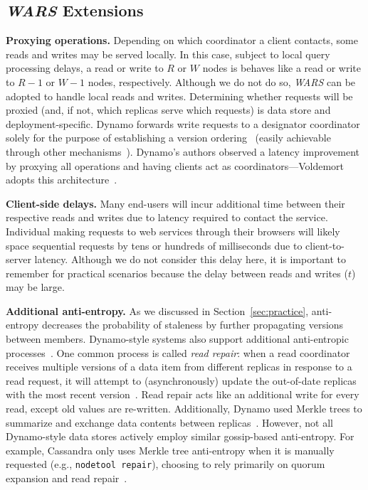 \documentclass{vldb}
\newcommand{\subsectionskip}{-0em}
\begin{document}
\vspace{\subsectionskip}\subsection{{\large \textit{WARS}} Extensions}
\label{sec:anti-entropy}

\textbf{Proxying operations.} Depending on which coordinator a client contacts, some reads and
writes may be served locally.  In this case, subject to local query
processing delays, a read or write to $R$ or $W$ nodes is behaves like
a read or write to $R-1$ or $W-1$ nodes, respectively.  Although we do
not do so, \textit{WARS} can be adopted to handle local reads and
writes.  Determining whether requests will be proxied (and, if not,
which replicas serve which requests) is data store and
deployment-specific.  Dynamo forwards write requests to a designator
coordinator solely for the purpose of establishing a version
ordering~\cite[Section 6.4]{dynamo} (easily achievable through other
mechanisms~\cite{zookeeper}).  Dynamo's authors observed a latency
improvement by proxying all operations and having clients act as
coordinators---Voldemort adopts this architecture~\cite{voldemortclient}.

\textbf{Client-side delays.} Many end-users will incur additional time
between their respective reads and writes due to latency required to
contact the service.  Individual making requests to web services
through their browsers will likely space sequential requests by tens
or hundreds of milliseconds due to client-to-server latency.  Although
we do not consider this delay here, it is important to remember for
practical scenarios because the delay between reads and writes ($t$)
may be large.

\textbf{Additional anti-entropy.} As we discussed in
Section~\ref{sec:practice}, anti-entropy decreases the probability of
staleness by further propagating versions between members.
Dynamo-style systems also support additional anti-entropic
processes~\cite{nosql}.  One common process is called \textit{read
  repair}: when a read coordinator receives multiple versions of a
data item from different replicas in response to a read request, it
will attempt to (asynchronously) update the out-of-date replicas with
the most recent version~\cite{dynamo}.  Read repair acts like an
additional write for every read, except old values are re-written.
Additionally, Dynamo used Merkle trees to summarize and exchange data
contents between replicas~\cite[Section 4.7]{dynamo}.  However, not
all Dynamo-style data stores actively employ similar gossip-based
anti-entropy.  For example, Cassandra only uses Merkle tree
anti-entropy when it is manually requested (e.g., \texttt{nodetool
  repair}), choosing to rely primarily on quorum expansion and read
repair~\cite{cassandra-merkle}.
\end{document}
